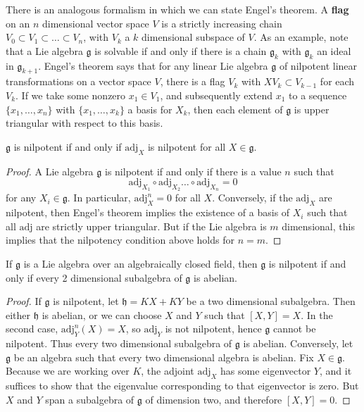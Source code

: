 There is an analogous formalism in which we can state Engel's theorem. A {\bf flag} on an $n$ dimensional vector space $V$ is a strictly increasing chain $V_0 \subset V_1 \subset \dots \subset V_n$, with $V_k$ a $k$ dimensional subspace of $V$. As an example, note that a Lie algebra $\mathfrak{g}$ is solvable if and only if there is a chain $\mathfrak{g}_k$ with $\mathfrak{g}_k$ an ideal in $\mathfrak{g}_{k+1}$. Engel's theorem says that for any linear Lie algebra $\mathfrak{g}$ of nilpotent linear transformations on a vector space $V$, there is a flag $V_k$ with $XV_k \subset V_{k-1}$ for each $V_k$. If we take some nonzero $x_1 \in V_1$, and subsequently extend $x_1$ to a sequence $\{ x_1, \dots, x_n \}$ with $\{ x_1, \dots, x_k \}$ a basis for $X_k$, then each element of $\mathfrak{g}$ is upper triangular with respect to this basis.

\begin{corollary}
    $\mathfrak{g}$ is nilpotent if and only if $\text{adj}_X$ is nilpotent for all $X \in \mathfrak{g}$.
\end{corollary}
\begin{proof}
    A Lie algebra $\mathfrak{g}$ is nilpotent if and only if there is a value $n$ such that
    \[ \text{adj}_{X_1} \circ \text{adj}_{X_2} \dots \circ \text{adj}_{X_n} = 0 \]
    for any $X_i \in \mathfrak{g}$. In particular, $\text{adj}_X^n = 0$ for all $X$. Conversely, if the $\text{adj}_X$ are nilpotent, then Engel's theorem implies the existence of a basis of $X_i$ such that all $\text{adj}$ are strictly upper triangular. But if the Lie algebra is $m$ dimensional, this implies that the nilpotency condition above holds for $n = m$.
\end{proof}

\begin{corollary}
    If $\mathfrak{g}$ is a Lie algebra over an algebraically closed field, then $\mathfrak{g}$ is nilpotent if and only if every 2 dimensional subalgebra of $\mathfrak{g}$ is abelian.
\end{corollary}
\begin{proof}
    If $\mathfrak{g}$ is nilpotent, let $\mathfrak{h} = KX + KY$ be a two dimensional subalgebra. Then either $\mathfrak{h}$ is abelian, or we can choose $X$ and $Y$ such that $[X,Y] = X$. In the second case, $\text{adj}^n_Y(X) = X$, so $\text{adj}_Y$ is not nilpotent, hence $\mathfrak{g}$ cannot be nilpotent. Thus every two dimensional subalgebra of $\mathfrak{g}$ is abelian. Conversely, let $\mathfrak{g}$ be an algebra such that every two dimensional algebra is abelian. Fix $X \in \mathfrak{g}$. Because we are working over $K$, the adjoint $\text{adj}_X$ has some eigenvector $Y$, and it suffices to show that the eigenvalue corresponding to that eigenvector is zero. But $X$ and $Y$ span a subalgebra of $\mathfrak{g}$ of dimension two, and therefore $[X,Y] = 0$.
\end{proof}


